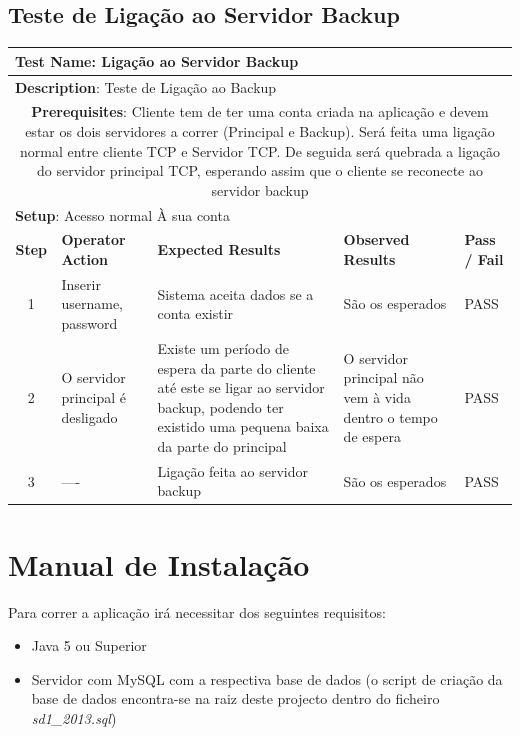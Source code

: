 \documentclass[12pt]{article} %
\begin{document}
\subsection{Teste de Ligação ao Servidor Backup}
\begin{table}[ht!]
	\begin{tabular}{|c|p{4cm}|p{4cm}|p{3cm}|p{1cm}|}
		\hline
		\multicolumn{5}{|l|}{\textbf{Test Name}: Ligação ao Servidor Backup}\\
		\hline
		\multicolumn{5}{|l|}{\textbf{Description}: Teste de Ligação ao Backup}\\
		\hline
		\multicolumn{5}{|p{14,5cm}|}{\textbf{Prerequisites}: Cliente tem de ter uma conta criada na aplicação e devem estar os dois servidores a correr (Principal e Backup). Será feita uma ligação normal entre cliente TCP e Servidor TCP. De seguida será quebrada a ligação do servidor principal TCP, esperando assim que o cliente se reconecte ao servidor backup}\\
		\hline
		\multicolumn{5}{|l|}{\textbf{Setup}: Acesso normal À sua conta}\\
		\hline
		\textbf{Step} & \textbf{Operator Action} & \textbf{Expected Results} & \textbf{Observed Results} & \textbf{Pass / Fail}\\
		\hline
		1 & Inserir username, password & Sistema aceita dados se a conta existir & São os esperados & PASS\\
		\hline
		2 & O servidor principal é desligado & Existe um período de espera da parte do cliente até este se ligar ao servidor backup, podendo ter existido uma pequena baixa da parte do principal & O servidor principal não vem à vida dentro o tempo de espera & PASS\\
		\hline
		3 & ---- & Ligação feita ao servidor backup & São os esperados & PASS\\
		\hline
	\end{tabular}
\end{table}




\newpage
\section{Manual de Instalação}
\label{sec:install}
Para correr a aplicação irá necessitar dos seguintes requisitos:
\begin{itemize}
	\item Java 5 ou Superior
	\item Servidor com MySQL com a respectiva base de dados (o script de criação da base de dados encontra-se na raiz deste projecto dentro do ficheiro \emph{sd1\_2013.sql})
\end{itemize}
\end{document}
